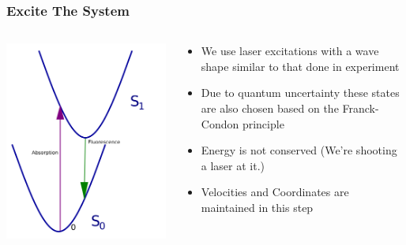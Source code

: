 \documentclass{beamer}
\begin{document}
\begin{frame}
  \frametitle{Excite The System}
\begin{columns}[c]
  \includegraphics[width=\textwidth]{Images/abs_chart_mirror}
  \begin{block}{}
    \begin{itemize}
    \item We use laser excitations with a wave shape similar to that done in experiment
    \item Due to quantum uncertainty these states are also chosen based on the Franck-Condon principle
    \item Energy is not conserved (We're shooting a laser at it.)
    \item Velocities and Coordinates are maintained in this step
    \end{itemize}
  \end{block}
\end{columns}
\end{frame}
\end{document}
